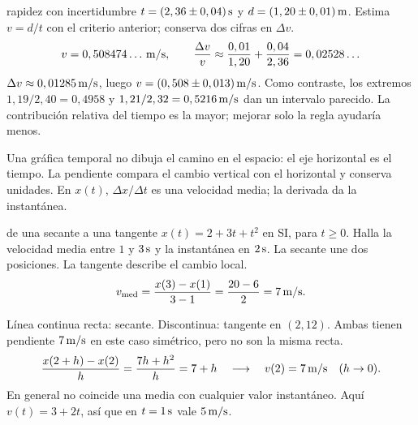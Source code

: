 \documentclass[11pt,a4paper]{article}
\begin{document}
\begin{exercisebox}{rapidez con incertidumbre}
$t=(2,36\pm0,04)\,\mathrm{s}$ y $d=(1,20\pm0,01)\,\mathrm{m}$.
Estima $v=d/t$ con el criterio anterior; conserva dos cifras en $\Delta v$.
\solutionblock
\[
v=0,508474\ldots\,\mathrm{m/s},\qquad
\frac{\Delta v}{v}\approx\frac{0,01}{1,20}+\frac{0,04}{2,36}=0,02528\ldots
\]
$\Delta v\approx0,01285\,\mathrm{m/s}$, luego $v=(0,508\pm0,013)\,\mathrm{m/s}$.
Como contraste, los extremos
$1,19/2,40=0,4958$ y $1,21/2,32=0,5216\,\mathrm{m/s}$ dan un intervalo parecido.
La contribuci\'on relativa del tiempo es la mayor; mejorar solo la regla ayudar\'ia menos.
\end{exercisebox}

Una gr\'afica temporal no dibuja el camino en el espacio: el eje horizontal es el
tiempo. La pendiente compara el cambio vertical con el horizontal y conserva unidades.
En $x(t)$, $\Delta x/\Delta t$ es una velocidad media; la derivada da la instant\'anea.

\begin{examplebox}{de una secante a una tangente}
 $x(t)=2+3t+t^2$ en SI, para $t\ge0$.
Halla la velocidad media entre $1$ y $3\,\mathrm{s}$ y la instant\'anea en $2\,\mathrm{s}$.
\solutionblock
{} La secante une dos posiciones. La tangente describe el cambio local.
\[
v_{\mathrm{med}}=\frac{x(3)-x(1)}{3-1}=\frac{20-6}{2}=7\,\mathrm{m/s}.
\]
\begin{center}
\end{center}
L\'inea continua recta: secante. Discontinua: tangente en $(2,12)$.
Ambas tienen pendiente $7\,\mathrm{m/s}$ en este caso sim\'etrico, pero no son la misma recta.
\[
\frac{x(2+h)-x(2)}{h}=\frac{7h+h^2}{h}=7+h
\quad\longrightarrow\quad v(2)=7\,\mathrm{m/s}\quad(h\to0).
\]
 En general no coincide una media con cualquier valor
instant\'aneo. Aqu\'i $v(t)=3+2t$, as\'i que en $t=1\,\mathrm{s}$ vale $5\,\mathrm{m/s}$.
\end{examplebox}
\end{document}
